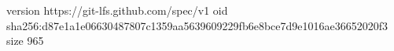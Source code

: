 version https://git-lfs.github.com/spec/v1
oid sha256:d87e1a1e06630487807c1359aa5639609229fb6e8bce7d9e1016ae36652020f3
size 965
